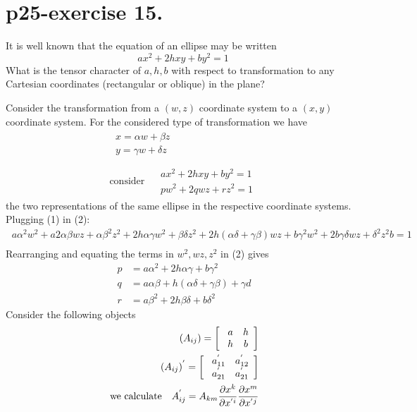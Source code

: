 \section{p25-exercise 15.}
\begin{tcolorbox}
It is well known that the equation of an ellipse may be written $$ ax^2+2hxy+by^2 =1$$
What is the tensor character of $a,h, b$ with respect to transformation to any Cartesian coordinates (rectangular or oblique) in the plane?
\end{tcolorbox}
Consider the transformation from a $(w,z)$ coordinate system to a $(x,y)$ coordinate system. For the considered type of transformation we have
\begin {align}
\begin{array}{c}
\ x = \alpha w + \beta z\\
\ y = \gamma w + \delta z\\
  \end{array}\\
\text{consider}\quad \begin{array}{c}
\ ax^2+2hxy+by^2 =1\\
\ pw^2+2qwz+rz^2 =1
  \end{array}
\end{align}
the two representations of the same ellipse in the respective coordinate systems. Plugging (1) in (2):
\begin {align}
\ a\alpha^2 w^2 + a 2 \alpha \beta w z + \alpha \beta^2 z^2 +2h \alpha \gamma w^2 +\beta \delta z^2+2h(\alpha \delta + \gamma \beta) w z + b \gamma^2 w^2 + 2 b \gamma \delta w z +\delta^2 z^2 b = 1\\
\end{align}
Rearranging and equating the terms in $w^2, wz, z^2$ in (2) gives
\begin{align}
\ p &= a \alpha^2 + 2 h \alpha \gamma + b \gamma^2\\
\ q &=  a \alpha \beta + h(\alpha \delta + \gamma \beta) + \gamma d\\
\ r &= a \beta^2 + 2 h \beta \delta +b \delta^2
\end{align}
Consider the following objects
\begin {align}
\ (A_{ij}) = \left[ { \begin{array}{cc}
  \ a &  h\\
  \ h   &b\\
  \end{array}} \right] \\
  \ (A_{ij})^{'} = \left[ { \begin{array}{cc}
  \ a^{'}_{11} &  a^{'}_{12}\\
  \ a^{'}_{21}  & a^{'}_{21}\\
  \end{array}} \right] \\
  \text{ we calculate}\quad A^{'}_{ij} = A_{km}\pdv{x^k}{x^{'i}}\pdv{x^m}{x^{'j}}
\end{align}
